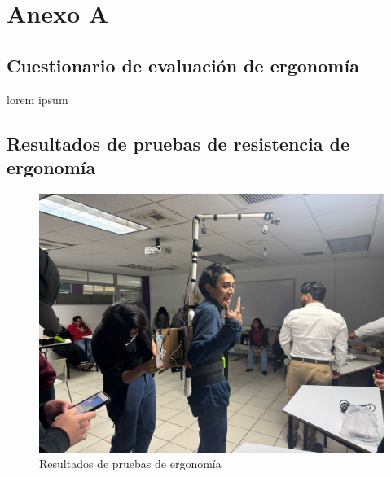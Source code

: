 


\chapter{Anexo A}
\section{Cuestionario de evaluación de ergonomía}
lorem ipsum

\section{Resultados de pruebas de resistencia de ergonomía}
\begin{figure}[H]
    \centering
    \includegraphics[width=1\textwidth]{img/PruebaErgonomica1.png}
    \caption{Resultados de pruebas de ergonomía}
    \label{fig:ergo-test1}
\end{figure}

